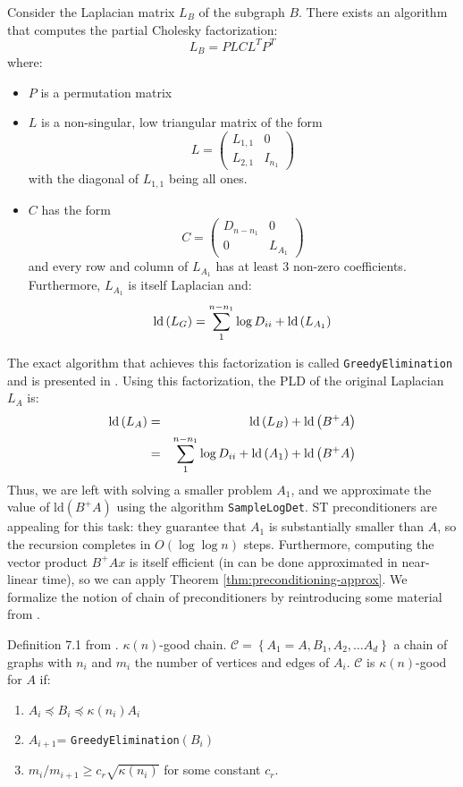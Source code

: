 Consider the Laplacian matrix $L_{B}$ of the subgraph $B$. There
exists an algorithm that computes the partial Cholesky factorization:
\[
L_{B}=PLCL^{T}P^{T}
\]
where: 
\begin{itemize}
\item $P$ is a permutation matrix 
\item $L$ is a non-singular, low triangular matrix of the form 
\[
L=\left(\begin{array}{cc}
L_{1,1} & 0\\
L_{2,1} & I_{n_{1}}
\end{array}\right)
\]
with the diagonal of $L_{1,1}$ being all ones. 
\item $C$ has the form 
\[
C=\left(\begin{array}{cc}
D_{n-n_{1}} & 0\\
0 & L_{A_{1}}
\end{array}\right)
\]
and every row and column of $L_{A_{1}}$ has at least 3 non-zero coefficients.
Furthermore, $L_{A_{1}}$ is itself Laplacian and: 
\[
\text{ld}\left(L_{G}\right)=\sum_{1}^{n-n_{1}}\log D_{ii}+\mbox{\text{ld}}\left(L_{A_{1}}\right)
\]

\end{itemize}
The exact algorithm that achieves this factorization is called \texttt{GreedyElimination}
and is presented in \cite{Koutis2010}. Using this factorization,
the PLD of the original Laplacian $L_{A}$ is: 
\begin{eqnarray}
\text{ld}\left(L_{A}\right) & = & \text{ld}\left(L_{B}\right)+\text{ld}\left(B^{+}A\right)\nonumber \\
 & = & \sum_{1}^{n-n_{1}}\log D_{ii}+\mbox{\text{ld}}\left(A_{1}\right)+\text{ld}\left(B^{+}A\right)\label{eq:chain-recursion}
\end{eqnarray}
Thus, we are left with solving a smaller problem $A_{1}$, and we
approximate the value of $\text{ld}\left(B^{+}A\right)$ using the
algorithm \texttt{SampleLogDet}. ST preconditioners are appealing
for this task: they guarantee that $A_{1}$ is substantially smaller
than $A$, so the recursion completes in $O\left(\log\log n\right)$
steps. Furthermore, computing the vector product $B^{+}Ax$ is itself
efficient (in can be done approximated in near-linear time), so we
can apply Theorem \ref{thm:preconditioning-approx}. We formalize
the notion of chain of preconditioners by reintroducing some material
from \cite{Koutis2010}.

\begin{definition} Definition 7.1 from \cite{Koutis2010}. $\kappa\left(n\right)$-good
chain. $\mathcal{C}=\left\{ A_{1}=A,B_{1},A_{2},\dots A_{d}\right\} $
a chain of graphs with $n_{i}$ and $m_{i}$ the number of vertices
and edges of $A_{i}$. $\mathcal{C}$ is $\kappa\left(n\right)$-good
for $A$ if:
\begin{enumerate}
\item $A_{i}\preceq B_{i}\preceq\kappa\left(n_{i}\right)A_{i}$ 
\item $A_{i+1}$= \texttt{GreedyElimination}$\left(B_{i}\right)$ 
\item $m_{i}/m_{i+1}\geq c_{r}\sqrt{\kappa\left(n_{i}\right)}$ for some
constant $c_{r}$. 
\end{enumerate}
\end{definition} 


